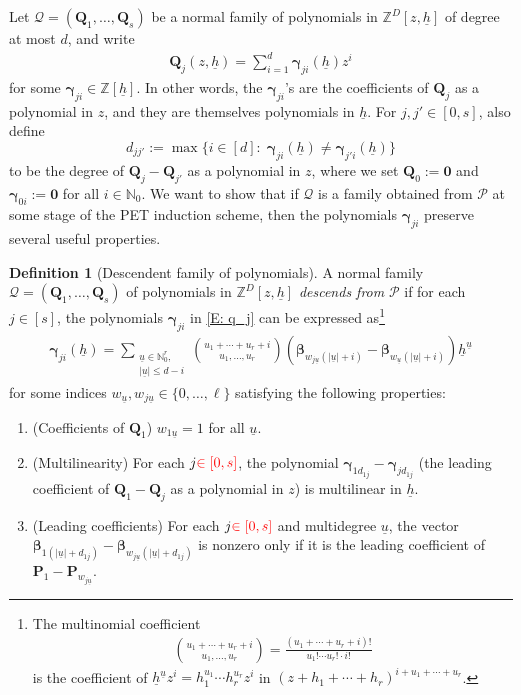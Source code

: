 \documentclass[11pt]{amsart}
\theoremstyle{definition}
\newtheorem{definition}[lemma]{Definition}
\newcommand{\N}{{\mathbb N}}
\newcommand{\Z}{{\mathbb Z}}
\newcommand{\CP}{{\mathcal P}}
\newcommand{\CQ}{{\mathcal Q}}
\newcommand{\bp}{{\mathbf{P}}}
\newcommand{\bq}{{\mathbf{Q}}}
\newcommand{\q}{{\mathbf{Q}}}
\newcommand{\bgamma}{{\boldsymbol{\gamma}}}
\newcommand{\bbeta}{{\boldsymbol{\beta}}}
\newcommand{\uh}{{\underline{h}}}
\newcommand{\uu}{{\underline{u}}}
\newcommand{\BK}[1]{{\color{red}{#1}}}
\begin{document}
Let $\CQ = (\q_1, \ldots, \q_{s})$ be a normal family of polynomials in $\Z^D[z, \uh]$ of degree at most $d$, and write 
      \begin{align}\label{E: q_j}
        \bq_j(z,\uh) = \sum_{i=1}^d \bgamma_{ji}(\uh)z^i      
      \end{align}
     for some $\bgamma_{ji}\in\Z[\uh]$. In other words, the $\bgamma_{ji}$'s are the coefficients of $\bq_j$ as a polynomial in $z$, and they are themselves polynomials in $\uh$. For $j,j'\in[0,s]$, also define
      $$d_{jj'} := \max\{i\in[d]:\; \bgamma_{ji}(\uh)\neq \bgamma_{j'i}(\uh)\}$$
      to be the degree of $\q_j - \q_{j'}$ as a polynomial in $z$,
      where we set $\bq_0 := \mathbf{0}$ and $\bgamma_{0i}:=\mathbf{0}$ for all $i\in\N_0$.
      We want to show that if $\CQ$ is a family obtained from $\CP$ at some stage of the PET induction scheme, then the polynomials $\bgamma_{ji}$ preserve several useful properties.
      
      \begin{definition}[Descendent family of polynomials]\label{D: descendence}
      A {normal} family $\CQ = (\q_1, \ldots, \q_{s})$ of polynomials in $\Z^D[z, \uh]$ \textit{descends from} $\CP$ if for each $j\in[s]$, the polynomials $\bgamma_{ji}$ in \eqref{E: q_j} can be expressed as\footnote{The multinomial coefficient
      \begin{align*}
          {{{u_1+\cdots + u_r+i}\choose{u_1, \ldots, u_r}}} = \frac{(u_1+\cdots+u_r+i)!}{u_1!\cdots u_r!\cdot i!}
      \end{align*}
      is the coefficient of $\uh^{\uu}z^i = h_1^{u_1}\cdots h_r^{u_r} z^i$ in $(z+h_1+\cdots + h_r)^{i+u_1+\cdots+u_r}$.}
          \begin{align}\label{E: gamma_ji}
              \bgamma_{ji}(\uh) =  \sum_{\substack{\uu\in \N_0^{r},\\ |\uu|\leq d-i}} {{{u_1+\cdots + u_r+i}\choose{u_1, \ldots, u_r}}}(\bbeta_{w_{j\uu}(|\uu|+i)}-\bbeta_{w_{\uu}(|\uu|+i)})\uh^\uu
          \end{align}
        for some indices $w_{\uu}, w_{j\uu}\in\{0, \ldots, \ell\}$ satisfying the following properties:
      \begin{enumerate}
          \item\label{i: w_1} (Coefficients of $\q_1$) $w_{1\uu} = 1$ for all $\uu$.
          \item\label{i: multilinear} (Multilinearity) For each $j\BK{\in[0,s]}$, the polynomial $\bgamma_{1d_{1j}}-\bgamma_{jd_{1j}}$ (the leading coefficient of $\bq_1 - \bq_{j}$ as a polynomial in $z$) is multilinear in $\uh$.  
        \item\label{i: leading coeffs} (Leading coefficients) For each $j\BK{\in[0,s]}$ and multidegree $\uu$, the vector $\bbeta_{1(|\uu|+d_{1j})}-\bbeta_{w_{j\uu}(|\uu|+d_{1j})}$ is nonzero only if it is the leading coefficient of  $\bp_1-\bp_{w_{j\uu}}$.
      \end{enumerate}
      \end{definition}
        
\end{document}
